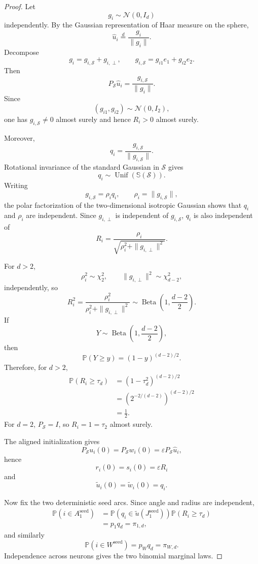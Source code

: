 \documentclass{article} %
\theoremstyle{plain}
\theoremstyle{definition}
\theoremstyle{remark}
\begin{document}
\begin{proof}
Let
\[
g_i
\sim
\mathcal N(0,I_d)
\]
independently. By the Gaussian representation of Haar measure on the sphere,
\[
\widehat u_i
\stackrel{d}{=}
\frac{g_i}{\|g_i\|}.
\]
Decompose
\[
g_i
=
g_{i,\mathcal S}
+
g_{i,\perp},
\qquad
g_{i,\mathcal S}
=
g_{i1}e_1+g_{i2}e_2.
\]
Then
\[
P_{\mathcal S}\widehat u_i
=
\frac{
g_{i,\mathcal S}
}{
\|g_i\|
}.
\]
Since
\[
(g_{i1},g_{i2})
\sim
\mathcal N(0,I_2),
\]
one has $g_{i,\mathcal S}\neq0$ almost surely and hence $R_i>0$ almost
surely.

Moreover,
\[
q_i
=
\frac{
g_{i,\mathcal S}
}{
\|g_{i,\mathcal S}\|
}.
\]
Rotational invariance of the standard Gaussian in $\mathcal S$ gives
\[
q_i
\sim
\operatorname{Unif}(\mathbb S(\mathcal S)).
\]
Writing
\[
g_{i,\mathcal S}
=
\rho_iq_i,
\qquad
\rho_i
=
\|g_{i,\mathcal S}\|,
\]
the polar factorization of the two-dimensional isotropic Gaussian shows that
$q_i$ and $\rho_i$ are independent. Since $g_{i,\perp}$ is independent of
$g_{i,\mathcal S}$, $q_i$ is also independent of
\[
R_i
=
\frac{
\rho_i
}{
\sqrt{
\rho_i^2+\|g_{i,\perp}\|^2
}
}.
\]

For $d>2$,
\[
\rho_i^2
\sim
\chi_2^2,
\qquad
\|g_{i,\perp}\|^2
\sim
\chi_{d-2}^2,
\]
independently, so
\[
R_i^2
=
\frac{
\rho_i^2
}{
\rho_i^2+\|g_{i,\perp}\|^2
}
\sim
\operatorname{Beta}
\left(
1,\frac{d-2}{2}
\right).
\]
If
\[
Y
\sim
\operatorname{Beta}
\left(
1,\frac{d-2}{2}
\right),
\]
then
\[
\mathbb P(Y\ge y)
=
(1-y)^{(d-2)/2}.
\]
Therefore, for $d>2$,
\[
\begin{aligned}
\mathbb P(R_i\ge\tau_d)
&=
\left(
1-\tau_d^2
\right)^{(d-2)/2}
\\
&=
\left(
2^{-2/(d-2)}
\right)^{(d-2)/2}
\\
&=
\frac12.
\end{aligned}
\]
For $d=2$, $P_{\mathcal S}=I$, so $R_i=1=\tau_2$ almost surely.

The aligned initialization gives
\[
P_{\mathcal S}u_i(0)
=
P_{\mathcal S}w_i(0)
=
\varepsilon P_{\mathcal S}\widehat u_i,
\]
hence
\[
r_i(0)
=
s_i(0)
=
\varepsilon R_i
\]
and
\[
\widetilde u_i(0)
=
\widetilde w_i(0)
=
q_i.
\]

Now fix the two deterministic seed arcs. Since angle and radius are
independent,
\[
\begin{aligned}
\mathbb P(i\in A_1^{\mathrm{seed}})
&=
\mathbb P
\left(
q_i\in\widetilde u(J_1^{\mathrm{seed}})
\right)
\mathbb P(R_i\ge\tau_d)
\\
&=
p_1q_d
=
\pi_{1,d},
\end{aligned}
\]
and similarly
\[
\mathbb P(i\in W^{\mathrm{seed}})
=
p_Wq_d
=
\pi_{W,d}.
\]
Independence across neurons gives the two binomial marginal laws.


\end{proof}
\end{document}
